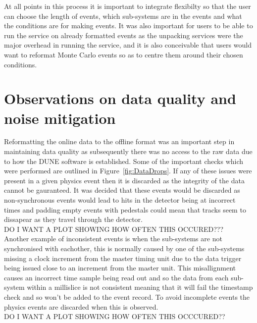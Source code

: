 At all points in this process it is important to integrate flexibilty so that the user can choose the length of events, which sub-systems are in the events and what the conditions are for making events. It was also important for users to be able to run the service on already formatted events as the unpacking services were the major overhead in running the service, and it is also conceivable that users would want to reformat Monte Carlo events so as to centre them around their chosen conditions.

\section{Observations on data quality and noise mitigation} \label{All the noise} %
Reformatting the online data to the offline format was an important step in maintaining data quality as subsequently there was no access to the raw data due to how the DUNE software is established. Some of the important checks which were performed are outlined in Figure~\ref{fig:DataDrops}. If any of these issues were present in a given physics event then it is discarded as the integrity of the data cannot be gauranteed. It was decided that these events would be discarded as non-synchronous events would lead to hits in the detector being at incorrect times and padding empty events with pedestals could mean that tracks seem to dissapear as they travel through the detector. \\

DO I WANT A PLOT SHOWING HOW OFTEN THIS OCCURED??? \\

Another example of inconsistent events is when the sub-systems are not synchronised with eachother, this is normally caused by one of the sub-systems missing a clock increment from the master timing unit due to the data trigger being issued close to an increment from the master unit. This misallignment causes an incorrect time sample being read out and so the data from each sub-system within a millislice is not consistent meaning that it will fail the timestamp check and so won't be added to the event record. To avoid incomplete events the physics events are discarded when this is observed. \\

DO I WANT A PLOT SHOWING HOW OFTEN THIS OCCCURED?? \\

